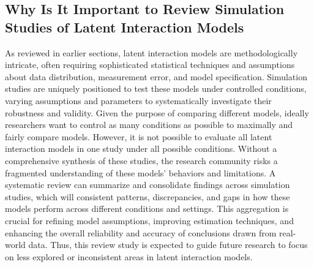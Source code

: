 \documentclass[
  11pt,
  man]{apa6}
\begin{document}
\hypertarget{why-is-it-important-to-review-simulation-studies-of-latent-interaction-models}{%
\subsection{Why Is It Important to Review Simulation Studies of Latent Interaction Models}\label{why-is-it-important-to-review-simulation-studies-of-latent-interaction-models}}

As reviewed in earlier sections, latent interaction models are methodologically intricate, often requiring sophisticated statistical techniques and assumptions about data distribution, measurement error, and model specification. Simulation studies are uniquely positioned to test these models under controlled conditions, varying assumptions and parameters to systematically investigate their robustness and validity. Given the purpose of comparing different models, ideally researchers want to control as many conditions as possible to maximally and fairly compare models. However, it is not possible to evaluate all latent interaction models in one study under all possible conditions. Without a comprehensive synthesis of these studies, the research community risks a fragmented understanding of these models' behaviors and limitations. A systematic review can summarize and consolidate findings across simulation studies, which will consistent patterns, discrepancies, and gaps in how these models perform across different conditions and settings. This aggregation is crucial for refining model assumptions, improving estimation techniques, and enhancing the overall reliability and accuracy of conclusions drawn from real-world data. Thus, this review study is expected to guide future research to focus on less explored or inconsistent areas in latent interaction models.
\end{document}
